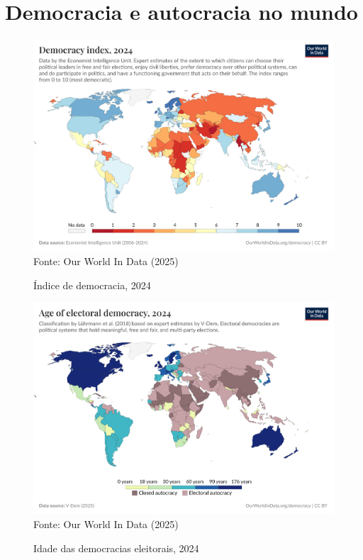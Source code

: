 \section{Democracia e autocracia no mundo}

\begin{figure}[ht]
    \centering
    \caption{Índice de democracia, 2024}
    \includegraphics[width=1\linewidth]{figuras/democracia/democracy-index-eiu.png}
    \label{fig:democracy-index-eiu}
    \footnotesize{Fonte: Our World In Data (2025)}
\end{figure}

\begin{figure}[ht]
    \centering
    \caption{Idade das democracias eleitorais, 2024}
    \includegraphics[width=1\linewidth]{figuras/democracia/age-of-electoral-democracy.png}
    \label{fig:age-of-electoral-democracy}
    \footnotesize{Fonte: Our World In Data (2025)}
\end{figure}


